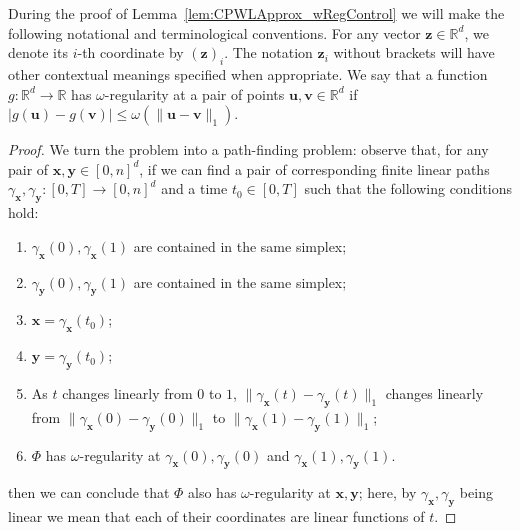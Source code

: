 \documentclass{article}
\numberwithin{equation}{section}
\theoremstyle{definition}
\begin{document}
During the proof of Lemma~\ref{lem:CPWLApprox_wRegControl} we will make the following notational and terminological conventions. 
For any vector $\mathbf{z}\in\mathbb{R}^d$, we denote its $i$-th coordinate by $(\mathbf{z})_i$. The notation $\mathbf{z}_i$ without brackets will have other contextual meanings specified when appropriate. We say that a function $g:\mathbb{R}^d \rightarrow \mathbb{R}$ has $\omega$-regularity at a pair of points $\mathbf{u},\mathbf{v}\in\mathbb{R}^d$ if 
$| g(\mathbf{u}) - g(\mathbf{v}) | \le \omega (\| \mathbf{u} - \mathbf{v} \|_1)$.


\begin{proof}
We turn the problem into a path-finding problem: observe that, for any pair of $\mathbf{x},\mathbf{y}\in [0,n]^d$, if we can find a pair of corresponding finite linear paths $\gamma_{\mathbf{x}},\gamma_{\mathbf{y}}: [0,T] \rightarrow [0,n]^d$ and a time $t_0\in[0,T]$ such that the following conditions hold:
\begin{enumerate}%
    \item \label{cond:path_1} $\gamma_{\mathbf{x}}(0),\gamma_{\mathbf{x}}(1)$ are contained in the same simplex;
    \item \label{cond:path_2} $\gamma_{\mathbf{y}}(0),\gamma_{\mathbf{y}}(1)$ are contained in the same simplex;
    \item \label{cond:path_3} $\mathbf{x} = \gamma_{\mathbf{x}}(t_0)$;
    \item \label{cond:path_4} $\mathbf{y} = \gamma_{\mathbf{y}}(t_0)$;
    \item \label{cond:path_5} As $t$ changes linearly from $0$ to $1$, 
    $\| \gamma_{\mathbf{x}}(t) - \gamma_{\mathbf{y}}(t) \| _ 1$
    changes linearly from $\|\gamma_{\mathbf{x}}(0) - \gamma_{\mathbf{y}}(0)\|_1$ to $\|\gamma_{\mathbf{x}}(1) - \gamma_{\mathbf{y}}(1)\|_1$;
    \item \label{cond:path_6} $\Phi$ has $\omega$-regularity at $\gamma_{\mathbf{x}}(0),\gamma_{\mathbf{y}}(0)$ and $\gamma_{\mathbf{x}}(1),\gamma_{\mathbf{y}}(1)$.
\end{enumerate}
then we can conclude that 
$\Phi$ also has $\omega$-regularity at $\mathbf{x},\mathbf{y}$; here, by $\gamma_{\mathbf{x}},\gamma_{\mathbf{y}}$ being linear we mean that each of their coordinates are linear functions of $t$.


\end{proof}
\end{document}
